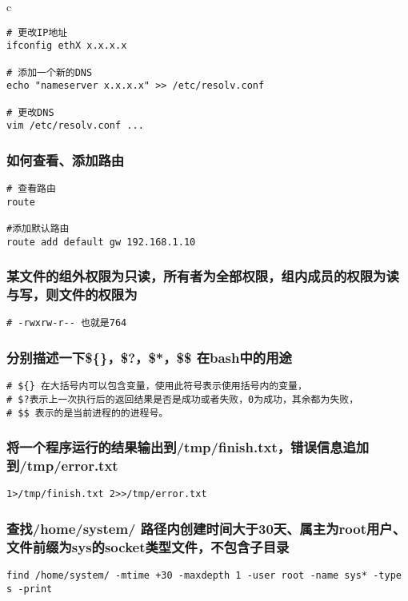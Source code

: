 \documentclass{article}
\begin{document}
\begin{mitned}{c}
\begin{verbatim}
# 更改IP地址
ifconfig ethX x.x.x.x

# 添加一个新的DNS
echo "nameserver x.x.x.x" >> /etc/resolv.conf

# 更改DNS
vim /etc/resolv.conf ...

\end{verbatim}

\subsubsection{如何查看、添加路由}
\begin{verbatim}
# 查看路由
route 

#添加默认路由
route add default gw 192.168.1.10
\end{verbatim}

\subsubsection{某文件的组外权限为只读，所有者为全部权限，组内成员的权限为读与写，则文件的权限为}
\begin{verbatim}
# -rwxrw-r-- 也就是764
\end{verbatim}

\subsubsection{分别描述一下\$\{\}，\$?，\$*，\$\$ 在bash中的用途}
\begin{verbatim}
# ${} 在大括号内可以包含变量，使用此符号表示使用括号内的变量，
# $?表示上一次执行后的返回结果是否是成功或者失败，0为成功，其余都为失败，
# $$ 表示的是当前进程的的进程号。
\end{verbatim}

\subsubsection{将一个程序运行的结果输出到/tmp/finish.txt，错误信息追加到/tmp/error.txt}
\begin{verbatim}
1>/tmp/finish.txt 2>>/tmp/error.txt
\end{verbatim}

\subsubsection{查找/home/system/ 路径内创建时间大于30天、属主为root用户、文件前缀为sys的socket类型文件，不包含子目录}
\begin{verbatim}
find /home/system/ -mtime +30 -maxdepth 1 -user root -name sys* -type s -print
\end{verbatim}


\end{mitned}
\end{document}
